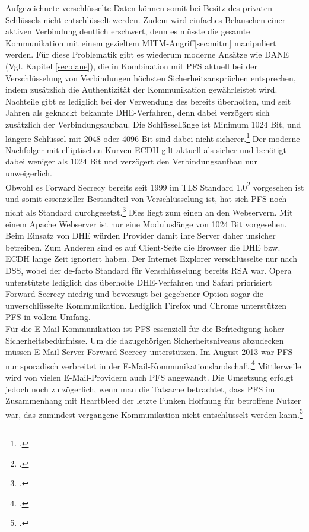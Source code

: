 Aufgezeichnete verschlüsselte Daten können somit bei Besitz des privaten Schlüssels nicht entschlüsselt werden. Zudem wird einfaches Belauschen einer aktiven Verbindung deutlich erschwert, denn es müsste die gesamte Kommunikation mit einem gezieltem \ac{MITM}-Angriff\ref{sec:mitm} manipuliert werden. Für diese Problematik gibt es wiederum moderne Ansätze wie DANE (Vgl. Kapitel \ref{sec:dane}), die in Kombination mit \ac{PFS} aktuell bei der Verschlüsselung von Verbindungen höchsten Sicherheitsansprüchen entsprechen, indem zusätzlich die Authentizität der Kommunikation gewährleistet wird.\medskip\\
Nachteile gibt es lediglich bei der Verwendung des bereits überholten, und seit Jahren als geknackt bekannte \ac{DHE}-Verfahren, denn dabei verzögert sich zusätzlich der Verbindungsaufbau. Die Schlüssellänge ist Minimum 1024 Bit, und längere Schlüssel mit 2048 oder 4096 Bit sind dabei nicht sicherer.\footcite[Vgl.][]{Boeck2013} Der moderne Nachfolger mit elliptischen Kurven \ac{ECDH} gilt aktuell als sicher und benötigt dabei weniger als 1024 Bit und verzögert den Verbindungsaufbau nur unweigerlich.\medskip\\
Obwohl es Forward Secrecy bereits seit 1999 im \ac{TLS} Standard 1.0\footcite[Vgl.][]{Boeck2013} vorgesehen ist und somit essenzieller Bestandteil von Verschlüsselung ist, hat sich \ac{PFS} noch nicht als Standard durchgesetzt.\footcite{SSLLabs} Dies liegt zum einen an den Webservern. Mit einem Apache Webserver ist nur eine Moduluslänge von 1024 Bit vorgesehen. Beim Einsatz von \ac{DHE} würden Provider damit ihre Server daher unsicher betreiben. Zum Anderen sind es auf Client-Seite die Browser die \ac{DHE} bzw. \ac{ECDH} lange Zeit ignoriert haben. Der Internet Explorer verschlüsselte nur nach DSS, wobei der de-facto Standard für Verschlüsselung bereits \ac{RSA} war. Opera unterstützte lediglich das überholte \ac{DHE}-Verfahren und Safari priorisiert Forward Secrecy niedrig und bevorzugt bei gegebener Option sogar die unverschlüsselte Kommunikation. Lediglich Firefox und Chrome unterstützen \ac{PFS} in vollem Umfang.\medskip\\
Für die E-Mail Kommunikation ist \ac{PFS} essenziell für die Befriedigung hoher Sicherheitsbedürfnisse. Um die dazugehörigen Sicherheitsniveaus abzudecken müssen E-Mail-Server Forward Secrecy unterstützen. Im August 2013 war \ac{PFS} nur sporadisch verbreitet in der E-Mail-Kommunikationslandschaft.\footcite[Vgl. ][]{Schulz2014} Mittlerweile wird von vielen E-Mail-Providern auch \ac{PFS} angewandt. Die Umsetzung erfolgt jedoch noch zu zögerlich, wenn man die Tatsache betrachtet, dass \ac{PFS} im Zusammenhang mit Heartbleed der letzte Funken Hoffnung für betroffene Nutzer war, das zumindest vergangene Kommunikation nicht entschlüsselt werden kann.\footcite[Vgl. ][]{Zhu2014}
